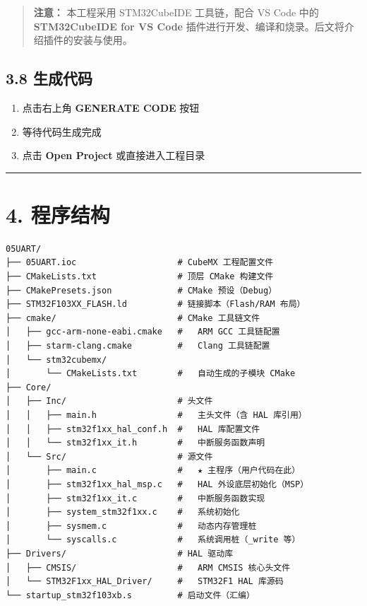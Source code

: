 \documentclass[
  chinese,
  UTF8,
  oneside,
  openany]{ctexbook}
\providecommand{\tightlist}{%
  \setlength{\itemsep}{0pt}\setlength{\parskip}{0pt}}
\begin{document}
\begin{quote}
\textbf{注意：} 本工程采用 STM32CubeIDE 工具链，配合 VS Code 中的
\textbf{STM32CubeIDE for VS Code}
插件进行开发、编译和烧录。后文将介绍插件的安装与使用。
\end{quote}

\subsection{3.8 生成代码}\label{ux751fux6210ux4ee3ux7801-2}

\begin{enumerate}
\def\labelenumi{\arabic{enumi}.}
\tightlist
\item
  点击右上角 \textbf{GENERATE CODE} 按钮
\item
  等待代码生成完成
\item
  点击 \textbf{Open Project} 或直接进入工程目录
\end{enumerate}

\begin{center}\rule{0.5\linewidth}{0.5pt}\end{center}

\section{4. 程序结构}\label{ux7a0bux5e8fux7ed3ux6784}

\begin{verbatim}
05UART/
├── 05UART.ioc                    # CubeMX 工程配置文件
├── CMakeLists.txt                # 顶层 CMake 构建文件
├── CMakePresets.json             # CMake 预设（Debug）
├── STM32F103XX_FLASH.ld          # 链接脚本（Flash/RAM 布局）
├── cmake/                        # CMake 工具链文件
│   ├── gcc-arm-none-eabi.cmake   #   ARM GCC 工具链配置
│   ├── starm-clang.cmake         #   Clang 工具链配置
│   └── stm32cubemx/
│       └── CMakeLists.txt        #   自动生成的子模块 CMake
├── Core/
│   ├── Inc/                      # 头文件
│   │   ├── main.h                #   主头文件（含 HAL 库引用）
│   │   ├── stm32f1xx_hal_conf.h  #   HAL 库配置文件
│   │   └── stm32f1xx_it.h        #   中断服务函数声明
│   └── Src/                      # 源文件
│       ├── main.c                #   ★ 主程序（用户代码在此）
│       ├── stm32f1xx_hal_msp.c   #   HAL 外设底层初始化（MSP）
│       ├── stm32f1xx_it.c        #   中断服务函数实现
│       ├── system_stm32f1xx.c    #   系统初始化
│       ├── sysmem.c              #   动态内存管理桩
│       └── syscalls.c            #   系统调用桩（_write 等）
├── Drivers/                      # HAL 驱动库
│   ├── CMSIS/                    #   ARM CMSIS 核心头文件
│   └── STM32F1xx_HAL_Driver/     #   STM32F1 HAL 库源码
└── startup_stm32f103xb.s         # 启动文件（汇编）
\end{verbatim}
\end{document}

